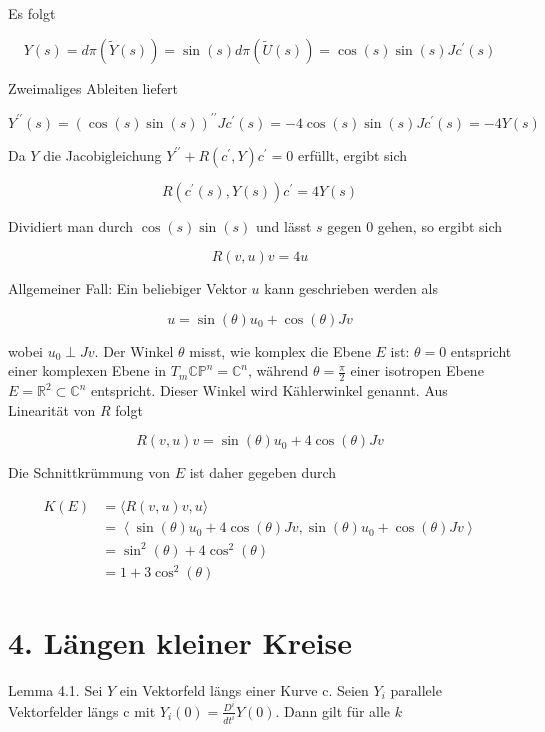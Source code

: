 \documentclass[10pt, letterpaper]{article}
\begin{document}
Es folgt


\begin{equation*}
Y(s)=d \pi(\tilde{Y}(s))=\sin (s) d \pi(\tilde{U}(s))=\cos (s) \sin (s) J c^{\prime}(s) \tag{10}
\end{equation*}


Zweimaliges Ableiten liefert

$$
Y^{\prime \prime}(s)=(\cos (s) \sin (s))^{\prime \prime} J c^{\prime}(s)=-4 \cos (s) \sin (s) J c^{\prime}(s)=-4 Y(s)
$$

Da $Y$ die Jacobigleichung $Y^{\prime \prime}+R\left(c^{\prime}, Y\right) c^{\prime}=0$ erfüllt, ergibt sich

$$
R\left(c^{\prime}(s), Y(s)\right) c^{\prime}=4 Y(s)
$$

Dividiert man durch $\cos (s) \sin (s)$ und lässt $s$ gegen 0 gehen, so ergibt sich

$$
R(v, u) v=4 u
$$

Allgemeiner Fall: Ein beliebiger Vektor $u$ kann geschrieben werden als

$$
u=\sin (\theta) u_{0}+\cos (\theta) J v
$$

wobei $u_{0} \perp J v$. Der Winkel $\theta$ misst, wie komplex die Ebene $E$ ist: $\theta=0$ entspricht einer komplexen Ebene in $T_{m} \mathbb{C P}^{n}=\mathbb{C}^{n}$, während $\theta=\frac{\pi}{2}$ einer isotropen Ebene $E=\mathbb{R}^{2} \subset \mathbb{C}^{n}$ entspricht. Dieser Winkel wird Kählerwinkel genannt. Aus Linearität von $R$ folgt

$$
R(v, u) v=\sin (\theta) u_{0}+4 \cos (\theta) J v
$$

Die Schnittkrümmung von $E$ ist daher gegeben durch

$$
\begin{aligned}
K(E) & =\langle R(v, u) v, u\rangle \\
& =\left\langle\sin (\theta) u_{0}+4 \cos (\theta) J v, \sin (\theta) u_{0}+\cos (\theta) J v\right\rangle \\
& =\sin ^{2}(\theta)+4 \cos ^{2}(\theta) \\
& =1+3 \cos ^{2}(\theta)
\end{aligned}
$$

\section*{4. Längen kleiner Kreise}
Lemma 4.1. Sei $Y$ ein Vektorfeld längs einer Kurve c. Seien $Y_{i}$ parallele Vektorfelder längs c mit $Y_{i}(0)=\frac{D^{i}}{d t^{i}} Y(0)$. Dann gilt für alle $k$
\end{document}

